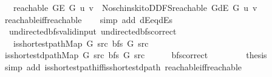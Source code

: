 \begin{isabellebody}
\ \ \ {\isachardoublequoteopen}reachable\ {\isacharparenleft}{\kern0pt}G{\isachardot}{\kern0pt}E\ G{\isacharparenright}{\kern0pt}\ u\ v\ {\isasymlongleftrightarrow}\ Noschinski{\isacharunderscore}{\kern0pt}to{\isacharunderscore}{\kern0pt}DDFS{\isachardot}{\kern0pt}reachable\ {\isacharparenleft}{\kern0pt}G{\isachardot}{\kern0pt}dE\ G{\isacharparenright}{\kern0pt}\ u\ v{\isachardoublequoteclose}%
\endisataginvisible
{\isafoldinvisible}%
%
\isadeliminvisible
\isanewline
%
\endisadeliminvisible
%
\isadelimproof
\ \ %
\endisadelimproof
%
\isatagproof
{}\isamarkupfalse%
\ reachable{\isacharunderscore}{\kern0pt}iff{\isacharunderscore}{\kern0pt}reachable\isanewline
\ \ \isamarkupfalse%
\ {\isacharparenleft}{\kern0pt}simp\ add{\isacharcolon}{\kern0pt}\ dE{\isacharunderscore}{\kern0pt}eq{\isacharunderscore}{\kern0pt}dEs{\isacharparenright}{\kern0pt}%
\endisatagproof
{\isafoldproof}%
%
\isadelimproof
\isanewline
%
\endisadelimproof
%
\isadeliminvisible
\isanewline
%
\endisadeliminvisible
%
\isataginvisible
{}\isamarkupfalse%
\ {\isacharparenleft}{\kern0pt}\ undirected{\isacharunderscore}{\kern0pt}bfs{\isacharunderscore}{\kern0pt}valid{\isacharunderscore}{\kern0pt}input{\isacharparenright}{\kern0pt}\ undirected{\isacharunderscore}{\kern0pt}bfs{\isacharunderscore}{\kern0pt}correct{\isacharcolon}{\kern0pt}\isanewline
\ \ \ {\isachardoublequoteopen}is{\isacharunderscore}{\kern0pt}shortest{\isacharunderscore}{\kern0pt}path{\isacharunderscore}{\kern0pt}Map\ G\ src\ {\isacharparenleft}{\kern0pt}bfs\ G\ src{\isacharparenright}{\kern0pt}{\isachardoublequoteclose}%
\endisataginvisible
{\isafoldinvisible}%
%
\isadeliminvisible
\isanewline
%
\endisadeliminvisible
%
\isadelimproof
%
\endisadelimproof
%
\isatagproof
{}\isamarkupfalse%
\ {\isacharminus}{\kern0pt}\isanewline
\ \ \isamarkupfalse%
\ {\isachardoublequoteopen}is{\isacharunderscore}{\kern0pt}shortest{\isacharunderscore}{\kern0pt}dpath{\isacharunderscore}{\kern0pt}Map\ G\ src\ {\isacharparenleft}{\kern0pt}bfs\ G\ src{\isacharparenright}{\kern0pt}{\isachardoublequoteclose}\isanewline
\ \ \ \ \isamarkupfalse%
\ bfs{\isacharunderscore}{\kern0pt}correct\isanewline
\ \ \ \ \isacommand{{\isachardot}{\kern0pt}}\isamarkupfalse%
\isanewline
\ \ \isamarkupfalse%
\ {\isacharquery}{\kern0pt}thesis\isanewline
\ \ \ \ \isamarkupfalse%
\ {\isacharparenleft}{\kern0pt}simp\ add{\isacharcolon}{\kern0pt}\ is{\isacharunderscore}{\kern0pt}shortest{\isacharunderscore}{\kern0pt}path{\isacharunderscore}{\kern0pt}iff{\isacharunderscore}{\kern0pt}is{\isacharunderscore}{\kern0pt}shortest{\isacharunderscore}{\kern0pt}dpath\ reachable{\isacharunderscore}{\kern0pt}iff{\isacharunderscore}{\kern0pt}reachable{\isacharparenright}{\kern0pt}\isanewline

\end{isabellebody}
